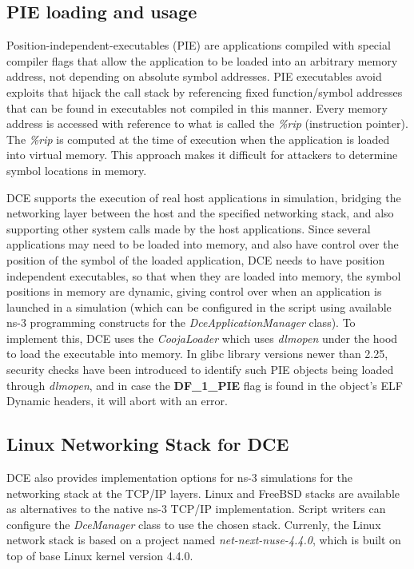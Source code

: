 \documentclass{sig-alternate}
\begin{document}
\subsection{PIE loading and usage}
Position-independent-executables (PIE) are applications compiled with special compiler flags that allow the application to be loaded into an arbitrary
memory address, not depending on absolute symbol addresses.  PIE executables
avoid exploits that hijack the call stack by referencing fixed function/symbol addresses that can be found in executables not compiled in this manner.
Every memory address is accessed with reference to what is called the \textit{\%rip} (instruction pointer). The \textit{\%rip} is computed at the time 
of execution when the application is loaded into virtual memory. This approach makes it difficult for attackers to determine symbol locations in memory.

DCE supports the execution of real host applications in simulation, bridging the networking layer between the host and the specified networking stack,
and also supporting other system calls made by the host applications. Since several applications may need to be loaded into memory, and also have control over the
position of the  symbol of the loaded application, DCE needs to have position independent executables, so that when they are loaded into memory,
the symbol positions in memory are dynamic, giving control over when an application is launched in a simulation (which can be configured in the script 
using available ns-3 programming constructs for the \textit{DceApplicationManager} class). To implement this, DCE uses the \textit{CoojaLoader} which 
uses \textit{dlmopen} under the hood to load the executable into memory. In glibc library versions newer than 2.25, security checks have been introduced to identify such 
PIE objects being loaded through \textit{dlmopen}, and in case the \textbf{DF\_1\_PIE} flag is found in the object's ELF Dynamic headers, it will abort with an error.
 

\subsection{Linux Networking Stack for DCE}
DCE also provides implementation options for ns-3 simulations for the networking stack at the TCP/IP layers.  Linux and FreeBSD stacks are available as alternatives to the native ns-3 TCP/IP implementation.
Script writers can configure the \textit{DceManager} class to use the chosen stack.
Currenly, the Linux network stack is based on a project named \textit{net-next-nuse-4.4.0}, which is built on top of base Linux kernel version 4.4.0.
\end{document}
